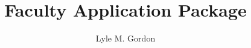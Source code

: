 \documentclass[10pt, letterpaper]{article}
\title{Faculty Application Package}
\author{Lyle M. Gordon}
\renewcommand{\&}{\libertine\char"E050 } %
\begin{document}
\renewcommand*{\theHfigure}{\arabic{section}.\arabic{figure}} 

\setlength\parindent{0pt}

\end{document}
